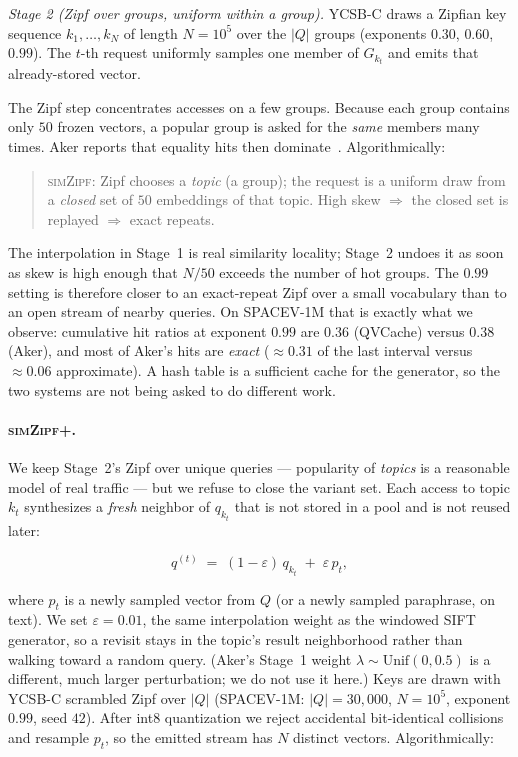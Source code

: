 \emph{Stage 2 (Zipf over groups, uniform within a group).}
YCSB-C draws a Zipfian key sequence $k_1,\dots,k_N$ of length $N{=}10^5$
over the $|Q|$ groups (exponents $0.30$, $0.60$, $0.99$). The $t$-th
request uniformly samples one member of $G_{k_t}$ and emits that
already-stored vector.

The Zipf step concentrates accesses on a few groups. Because each
group contains only $50$ frozen vectors, a popular group is asked for
the \emph{same} members many times. Aker reports that equality hits
then dominate~\cite{aker}. Algorithmically:

\begin{quote}
\textsc{simZipf}: Zipf chooses a \emph{topic} (a group); the request is
a uniform draw from a \emph{closed} set of $50$ embeddings of that
topic. High skew $\Rightarrow$ the closed set is replayed
$\Rightarrow$ exact repeats.
\end{quote}

The interpolation in Stage~1 is real similarity locality; Stage~2
undoes it as soon as skew is high enough that $N/50$ exceeds the
number of hot groups. The $0.99$ setting is therefore closer to an
exact-repeat Zipf over a small vocabulary than to an open stream of
nearby queries. On SPACEV-1M that is exactly what we observe:
cumulative hit ratios at exponent $0.99$ are
$0.36$ (QVCache) versus $0.38$ (Aker), and most of Aker's hits are
\emph{exact} ($\approx 0.31$ of the last interval versus
$\approx 0.06$ approximate). A hash table is a sufficient cache for
the generator, so the two systems are not being asked to do different
work.

\paragraph{\textsc{simZipf+}.}
We keep Stage~2's Zipf over unique queries --- popularity of
\emph{topics} is a reasonable model of real traffic --- but we refuse
to close the variant set. Each access to topic $k_t$ synthesizes a
\emph{fresh} neighbor of $q_{k_t}$ that is not stored in a pool and is
not reused later:

\[
  q^{(t)} \;=\; (1-\varepsilon)\,q_{k_t} \;+\; \varepsilon\,p_t,
\]

where $p_t$ is a newly sampled vector from $Q$ (or a newly sampled
paraphrase, on text). We set $\varepsilon{=}0.01$, the same
interpolation weight as the windowed SIFT generator, so a revisit
stays in the topic's result neighborhood rather than walking toward a
random query. (Aker's Stage~1 weight $\lambda\sim\mathrm{Unif}(0,0.5)$
is a different, much larger perturbation; we do not use it here.)
Keys are drawn with YCSB-C scrambled Zipf over $|Q|$ (SPACEV-1M:
$|Q|{=}30{,}000$, $N{=}10^5$, exponent $0.99$, seed $42$). After
int8 quantization we reject accidental bit-identical collisions and
resample $p_t$, so the emitted stream has $N$ distinct vectors.
Algorithmically:

